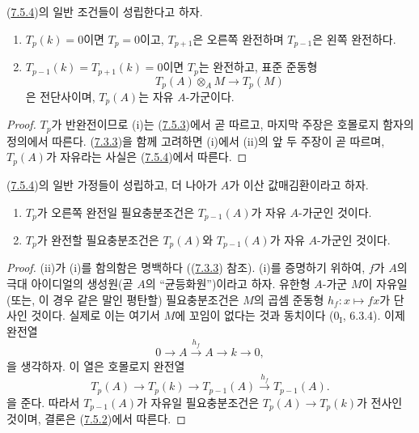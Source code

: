 \begin{corollary}[7.5.5]
\label{III.7.5.5-fr}
(\hyperref[III.7.5.4-fr]{7.5.4})의 일반 조건들이 성립한다고 하자.
\begin{enumerate}
  \item[(i)] $T_p(k)=0$이면 $T_p=0$이고, $T_{p+1}$은 오른쪽 완전하며
    $T_{p-1}$은 왼쪽 완전하다.
  \item[(ii)] $T_{p-1}(k)=T_{p+1}(k)=0$이면 $T_p$는 완전하고, 표준
    준동형
    \[
      T_p(A)\otimes_A M\longrightarrow T_p(M)
    \]
    은 전단사이며, $T_p(A)$는 자유 $A$-가군이다.
\end{enumerate}
\end{corollary}

\begin{proof}
$T_p$가 반완전이므로 (i)는 (\hyperref[III.7.5.3-fr]{7.5.3})에서 곧
따르고, 마지막 주장은 호몰로지 함자의 정의에서 따른다.
(\hyperref[III.7.3.3-fr]{7.3.3})을 함께 고려하면 (i)에서 (ii)의 앞 두
주장이 곧 따르며, $T_p(A)$가 자유라는 사실은
(\hyperref[III.7.5.4-fr]{7.5.4})에서 따른다.
\end{proof}

\begin{corollary}[7.5.6]
\label{III.7.5.6-fr}
(\hyperref[III.7.5.4-fr]{7.5.4})의 일반 가정들이 성립하고, 더 나아가
$A$가 이산 값매김환이라고 하자.
\begin{enumerate}
  \item[(i)] $T_p$가 오른쪽 완전일 필요충분조건은 $T_{p-1}(A)$가
    자유 $A$-가군인 것이다.
  \item[(ii)] $T_p$가 완전할 필요충분조건은 $T_p(A)$와 $T_{p-1}(A)$가
    자유 $A$-가군인 것이다.
\end{enumerate}
\end{corollary}

\begin{proof}
(ii)가 (i)를 함의함은 명백하다
((\hyperref[III.7.3.3-fr]{7.3.3}) 참조). (i)를 증명하기 위하여,
$f$가 $A$의 극대 아이디얼의 생성원(곧 $A$의 ``균등화원'')이라고
하자. 유한형 $A$-가군 $M$이 자유일(또는, 이 경우 같은 말인 평탄할)
필요충분조건은 $M$의 곱셈 준동형 $h_f:x\mapsto fx$가 단사인 것이다.
실제로 이는 여기서 $M$에 꼬임이 없다는 것과 동치이다
($0_{\mathrm I}$, 6.3.4). 이제 완전열
\[
  0\longrightarrow A\xrightarrow{h_f}A\longrightarrow k\longrightarrow0,
\]
을 생각하자. 이 열은 호몰로지 완전열
\[
  T_p(A)
  \longrightarrow T_p(k)
  \longrightarrow T_{p-1}(A)
  \xrightarrow{h_f}T_{p-1}(A).
\]
을 준다. 따라서 $T_{p-1}(A)$가 자유일 필요충분조건은
$T_p(A)\to T_p(k)$가 전사인 것이며, 결론은
(\hyperref[III.7.5.2-fr]{7.5.2})에서 따른다.
\end{proof}

